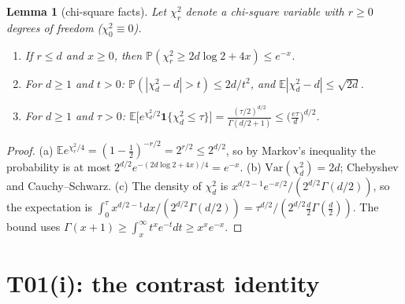 \documentclass[11pt]{article}
\newtheorem{lemma}[theorem]{Lemma}
\theoremstyle{remark}
\newcommand{\E}{\mathbb E}
\newcommand{\Prob}{\mathbb P}
\begin{document}
\begin{lemma}[chi-square facts]\label{lem:chi}
Let $\chi^2_r$ denote a chi-square variable with $r\ge0$ degrees of freedom ($\chi^2_0\equiv0$).
\begin{enumerate}
\item[(a)] If $r\le d$ and $x\ge0$, then $\Prob(\chi^2_r\ge 2d\log2+4x)\le e^{-x}$.
\item[(b)] For $d\ge1$ and $t>0$: $\Prob(|\chi^2_d-d|>t)\le 2d/t^2$, and $\E|\chi^2_d-d|\le\sqrt{2d}$.
\item[(c)] For $d\ge1$ and $\tau>0$: $\E\big[e^{\chi^2_d/2}\mathbf 1\{\chi^2_d\le\tau\}\big]=\frac{(\tau/2)^{d/2}}{\Gamma(d/2+1)}\le\big(\frac{e\tau}{d}\big)^{d/2}$.
\end{enumerate}
\end{lemma}
\begin{proof}
(a) $\E e^{\chi^2_r/4}=(1-\frac12)^{-r/2}=2^{r/2}\le2^{d/2}$, so by Markov's inequality the probability is at most $2^{d/2}e^{-(2d\log2+4x)/4}=e^{-x}$.
(b) $\mathrm{Var}(\chi^2_d)=2d$; Chebyshev and Cauchy--Schwarz.
(c) The density of $\chi^2_d$ is $x^{d/2-1}e^{-x/2}/(2^{d/2}\Gamma(d/2))$, so the expectation is $\int_0^\tau x^{d/2-1}dx/(2^{d/2}\Gamma(d/2))=\tau^{d/2}/(2^{d/2}\frac d2\Gamma(\frac d2))$. The bound uses $\Gamma(x+1)\ge\int_x^\infty t^xe^{-t}dt\ge x^xe^{-x}$.
\end{proof}

\section{T01(i): the contrast identity}\label{sec:T01i}
\end{document}
